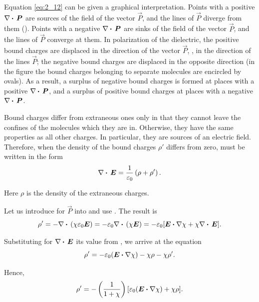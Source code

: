 Equation \eqref{eq:2_12} can be given a graphical interpretation. Points with a positive $\nabla\boldsymbol{\cdot}\,\boldsymbol{P}$ are sources of the field of the vector $\vec{P}$, and the lines of $\vec{P}$ diverge from them (). Points with a negative $\nabla\boldsymbol{\cdot}\,\boldsymbol{P}$ are sinks of the field of the vector $\vec{P}$, and the lines of $\vec{P}$ converge at them.
In polarization of the dielectric, the positive bound charges are displaced in the direction of the vector $\vec{P}$, \ie, in the direction of the lines $\vec{P}$; the negative bound charges are displaced in the opposite direction (in the figure the bound charges belonging to separate molecules are encircled by ovals). As a result, a surplus of negative bound charges is formed at places with a positive $\nabla\boldsymbol{\cdot}\,\boldsymbol{P}$, and a surplus of positive bound charges at places with a negative $\nabla\boldsymbol{\cdot}\,\boldsymbol{P}$.

Bound charges differ from extraneous ones only in that they cannot leave the confines of the molecules which they are in. Otherwise, they have the same properties as all other charges. In particular, they are sources of an electric field. Therefore, when the density of the bound charges $\rho'$ differs from zero,  must be written in the form
\begin{equation}\label{eq:2_13}
    \nabla\boldsymbol{\cdot}\,\boldsymbol{E} = \frac{1}{\varepsilon_0} \left(\rho + \rho'\right).
\end{equation}

\noindent
Here $\rho$ is the density of the extraneous charges.

Let us introduce  for $\vec{P}$ into  and use . The result is
\begin{equation*}
    \rho' = - \nabla\boldsymbol{\cdot}\,(\chi\varepsilon_0\boldsymbol{E}) = - \varepsilon_0 \nabla\boldsymbol{\cdot}\,(\chi\boldsymbol{E}) = - \varepsilon_0 [\boldsymbol{E}\boldsymbol{\cdot}\nabla\chi + \chi \nabla\boldsymbol{\cdot}\,\boldsymbol{E}].
\end{equation*}

\noindent
Substituting for $\nabla\boldsymbol{\cdot}\,\boldsymbol{E}$ its value from , we arrive at the equation
\begin{equation*}
    \rho' = - \varepsilon_0 (\boldsymbol{E}\boldsymbol{\cdot}\nabla\chi) - \chi\rho - \chi\rho'.
\end{equation*}

\noindent
Hence,
\begin{equation}\label{eq:2_14}
    \rho' = - \left(\frac{1}{1+\chi}\right) [\varepsilon_0 (\boldsymbol{E}\boldsymbol{\cdot}\nabla\chi) + \chi\rho].
\end{equation}

